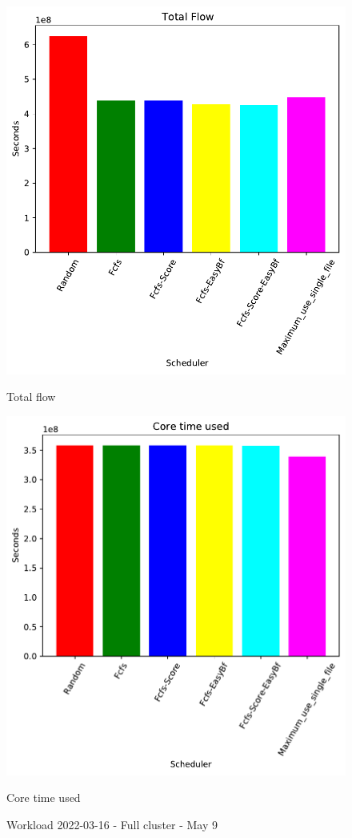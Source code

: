 \documentclass[a4paper]{article}
\begin{document}
\begin{figure}[H]
	\begin{minipage}[b]{0.5\linewidth}\centering\includegraphics[width=1\linewidth]{MBSS/plot/2022-03-16_Total_flow450_128_32_256_4_1024.pdf}\caption{Total flow}\vspace{4ex}\end{minipage}
	\begin{minipage}[b]{0.5\linewidth}\centering\includegraphics[width=1\linewidth]{MBSS/plot/2022-03-16_Core_time_used450_128_32_256_4_1024.pdf}\caption{Core time used}\vspace{4ex}\end{minipage}\caption{Workload 2022-03-16 - Full cluster - May 9}\end{figure}
\end{document}
